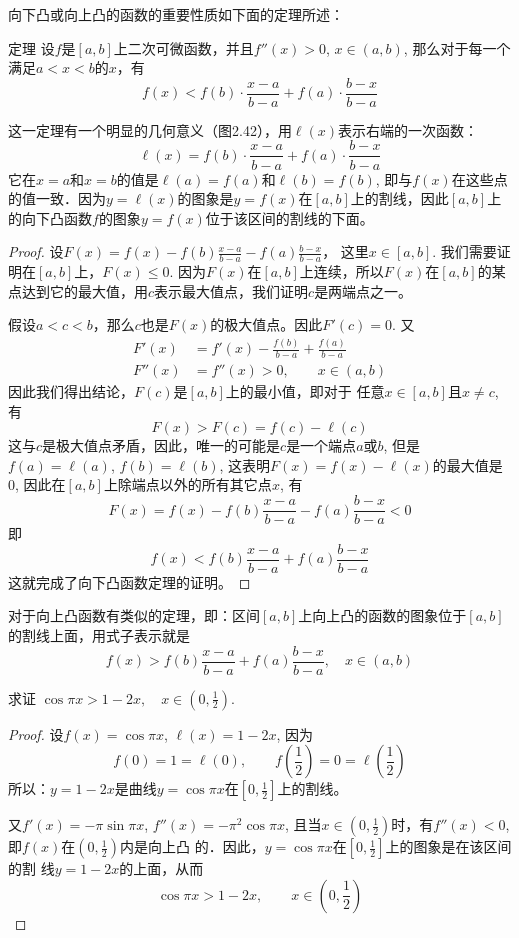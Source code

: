 向下凸或向上凸的函数的重要性质如下面的定理所述：

\begin{blk}
    {定理} 设$f$是$[a,b]$上二次可微函数，并且$f''(x)>0$, $x\in (a,b)$, 那么对于每一个满足$a<x<b$的$x$，有
\[f(x)<f(b)\cdot \frac{x-a}{b-a}+f(a)\cdot \frac{b-x}{b-a}\]
\end{blk}

这一定理有一个明显的几何意义（图2.42），用$\ell(x)$表示右端的一次函数：
\[\ell(x)=f(b)\cdot \frac{x-a}{b-a}+f(a)\cdot \frac{b-x}{b-a}\]
    它在$x=a$和$x=b$的值是$\ell(a)=f(a)$和$\ell(b)=f(b)$, 即与$f(x)$在这些点的值一致．因为$y=\ell(x)$的图象是$y=f(x)$在$[a,b]$上的割线，因此$[a,b]$上的向下凸函数$f$的图象$y=f(x)$位于该区间的割线的下面。





\begin{proof}
设$F(x)=f(x)-f(b)\frac{x-a}{b-a}-f(a)\frac{b-x}{b-a}$，
这里$x\in [a,b]$. 我们需要证明在$[a,b]$上，$F(x)\le 0$. 因为$F(x)$在$[a,b]$上连续，所以$F(x)$在$[a,b]$的某点达到它的最大值，用$c$表示最大值点，我们证明$c$是两端点之一。

假设$a<c<b$，那么$c$也是$F(x)$的极大值点。因此$F'(c)=0$. 又
\[\begin{split}
    F'(x)&=f'(x)-\frac{f(b)}{b-a}+\frac{f(a)}{b-a}\\
    F''(x)&=f''(x)>0,\qquad x\in(a,b)
\end{split}\]
因此我们得出结论，$F(c)$是$[a,b]$上的最小值，即对于
任意$x\in [a,b]$且$x\ne c$, 有
\[F (x) > F (c) =f (c) -\ell (c)\]
这与$c$是极大值点矛盾，因此，唯一的可能是$c$是一个端点$a$或$b$, 但是$f(a)=\ell(a)$, $f(b)=\ell(b)$, 这表明$F(x)=f(x)-\ell(x)$的最大值是0, 因此在$[a,b]$上除端点以外的所有其它点$x$, 有
\[F (x) =f (x) -f (b) \frac{x-a}{b-a}-f (a) \frac{b-x}{b-a}<0\]
即
\[f (x)<f (b) \frac{x-a}{b-a}+f (a) \frac{b-x}{b-a}\]
这就完成了向下凸函数定理的证明。
\end{proof}

对于向上凸函数有类似的定理，即：区间$[a,b]$上向上凸的函数的图象位于$[a,b]$的割线上面，用式子表示就是
\[f (x)>f (b) \frac{x-a}{b-a}+f (a) \frac{b-x}{b-a},\quad x\in(a,b)\]

\begin{example}
    求证 $\cos\pi x>1-2x,\quad x\in\left(0, \frac{1}{2}\right)$.
\end{example}


\begin{proof}
    设$f(x)=\cos\pi x$, $\ell (x)=1-2x$, 因为
\[f (0) =1=\ell (0) ,\qquad f \left(\frac{1}{2}\right) =0=\ell\left(\frac{1}{2}\right)\]
所以：$y=1-2x$是曲线$y=\cos\pi x$在$\left[0,\frac{1}{2}\right]$上的割线。

又$f'(x)=-\pi \sin\pi x$, $f''(x)=-\pi^2\cos\pi x$, 且当$x\in \left(0,\frac{1}{2}\right)$时，有$f''(x)<0$, 即$f(x)$在$\left(0,\frac{1}{2}\right)$内是向上凸
的．因此，$y=\cos\pi x$在$\left[0,\frac{1}{2}\right]$上的图象是在该区间的割
线$y=1-2x$的上面，从而
\[\cos\pi x>1-2x,\qquad x\in \left(0,\frac{1}{2}\right)\]
\end{proof}

